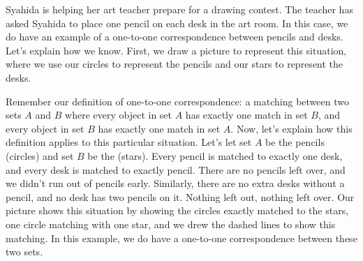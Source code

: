 \documentclass{ximera}
\begin{document}
\begin{example}
Syahida is helping her art teacher prepare for a drawing contest. The teacher has asked Syahida to place one pencil on each desk in the art room. In this case, we do have an example of a one-to-one correspondence between pencils and desks. Let's explain how we know. First, we draw a picture to represent this situation, where we use our circles to represent the pencils and our stars to represent the desks.
\begin{center}
\end{center}
Remember our definition of one-to-one correspondence: a matching between two sets $A$ and $B$ where every object in set $A$ has exactly one match in set $B$, and every object in set $B$ has exactly one match in set $A$. Now, let's explain how this definition applies to this particular situation. Let's let set $A$ be the pencils (circles) and set $B$ be the  (stars). Every pencil is matched to exactly one desk, and every desk is matched to exactly  pencil. There are no pencils left over, and we didn't run out of pencils early. Similarly, there are no extra desks without a pencil, and no desk has two pencils on it. Nothing left out, nothing left over. Our picture shows this situation by showing the circles exactly matched to the stars, one circle matching with one star, and we drew the dashed lines to show this matching. In this example, we do have a one-to-one correspondence between these two sets.

\end{example}
\end{document}
